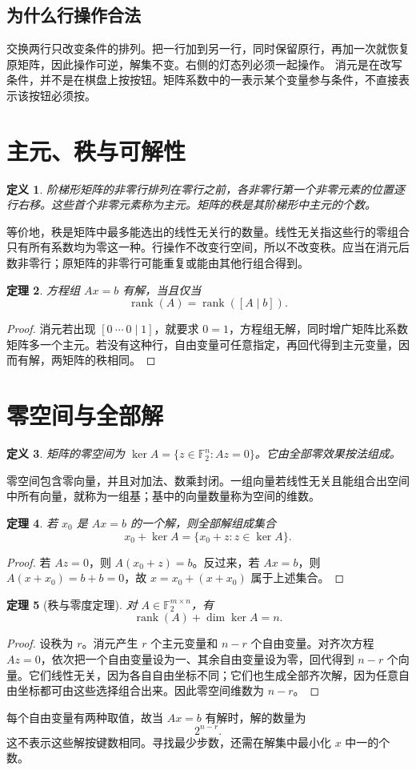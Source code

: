 \documentclass[UTF8,fontset=fandol,11pt,a4paper]{ctexart}
\newtheorem{definition}{定义}[section]
\newtheorem{theorem}[definition]{定理}
\newcommand{\F}{\mathbb F_2}
\newcommand{\rank}{\operatorname{rank}}
\begin{document}
\subsection{为什么行操作合法}
交换两行只改变条件的排列。把一行加到另一行，同时保留原行，再加一次就恢复原矩阵，因此操作可逆，解集不变。右侧的灯态列必须一起操作。
消元是在改写条件，并不是在棋盘上按按钮。矩阵系数中的一表示某个变量参与条件，不直接表示该按钮必须按。
\section{主元、秩与可解性}
\begin{definition}
阶梯形矩阵的非零行排列在零行之前，各非零行第一个非零元素的位置逐行右移。这些首个非零元素称为主元。矩阵的秩是其阶梯形中主元的个数。
\end{definition}
等价地，秩是矩阵中最多能选出的线性无关行的数量。线性无关指这些行的零组合只有所有系数均为零这一种。行操作不改变行空间，所以不改变秩。应当在消元后数非零行；原矩阵的非零行可能重复或能由其他行组合得到。
\begin{theorem}
方程组 $Ax=b$ 有解，当且仅当
\[\rank(A)=\rank([A\mid b]).\]
\end{theorem}
\begin{proof}
消元若出现 $[0\ \cdots\ 0\mid1]$，就要求 $0=1$，方程组无解，同时增广矩阵比系数矩阵多一个主元。若没有这种行，自由变量可任意指定，再回代得到主元变量，因而有解，两矩阵的秩相同。
\end{proof}
\section{零空间与全部解}
\begin{definition}
矩阵的零空间为 $\ker A=\{z\in\F^n:Az=0\}$。它由全部零效果按法组成。
\end{definition}
零空间包含零向量，并且对加法、数乘封闭。一组向量若线性无关且能组合出空间中所有向量，就称为一组基；基中的向量数量称为空间的维数。
\begin{theorem}
若 $x_0$ 是 $Ax=b$ 的一个解，则全部解组成集合
\[x_0+\ker A=\{x_0+z:z\in\ker A\}.\]
\end{theorem}
\begin{proof}
若 $Az=0$，则 $A(x_0+z)=b$。反过来，若 $Ax=b$，则 $A(x+x_0)=b+b=0$，故 $x=x_0+(x+x_0)$ 属于上述集合。
\end{proof}
\begin{theorem}[秩与零度定理]
对 $A\in\F^{m\times n}$，有
\[\boxed{\rank(A)+\dim\ker A=n.}\]
\end{theorem}
\begin{proof}
设秩为 $r$。消元产生 $r$ 个主元变量和 $n-r$ 个自由变量。对齐次方程 $Az=0$，依次把一个自由变量设为一、其余自由变量设为零，回代得到 $n-r$ 个向量。它们线性无关，因为各自自由坐标不同；它们也生成全部齐次解，因为任意自由坐标都可由这些选择组合出来。因此零空间维数为 $n-r$。
\end{proof}
每个自由变量有两种取值，故当 $Ax=b$ 有解时，解的数量为
\[\boxed{2^{n-r}.}\]
这不表示这些解按键数相同。寻找最少步数，还需在解集中最小化 $x$ 中一的个数。
\end{document}
